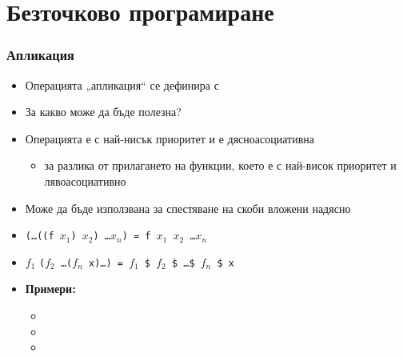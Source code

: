 \documentclass[alsotrans,beameroptions={aspectratio=169}]{beamerswitch}
\begin{document}
\section{Безточково програмиране}

\begin{frame}
  \frametitle{Апликация}

  \begin{itemize}[<+->]
  \item Операцията „апликация“ се дефинира с 
  \item За какво може да бъде полезна?
  \item Операцията \lst{$} е с най-нисък приоритет и е дясноасоциативна
    \begin{itemize}
    \item за разлика от прилагането на функции, което е с най-висок приоритет и лявоасоциативно
    \end{itemize}
  \item Може да бъде използвана за спестяване на скоби вложени надясно
  \item \tt(\ldots\tt{((f} $x_1$\tt) $x_2$\tt) \ldots $x_n$\tt) = \tt f $x_1$ $x_2$ \ldots $x_n$
  \item $f_1$ \tt($f_2$ \ldots \tt($f_n$ \tt{x)}\ldots\tt) = $f_1$ \tt\$ $f_2$ \tt\$ \ldots \tt\$ $f_n$ \tt{\$ x}
  \item \textbf{Примери:}
    \begin{itemize}
    \item {}
    \item {}
    \item {}
    \end{itemize}
  \end{itemize}
\end{frame}
\end{document}
